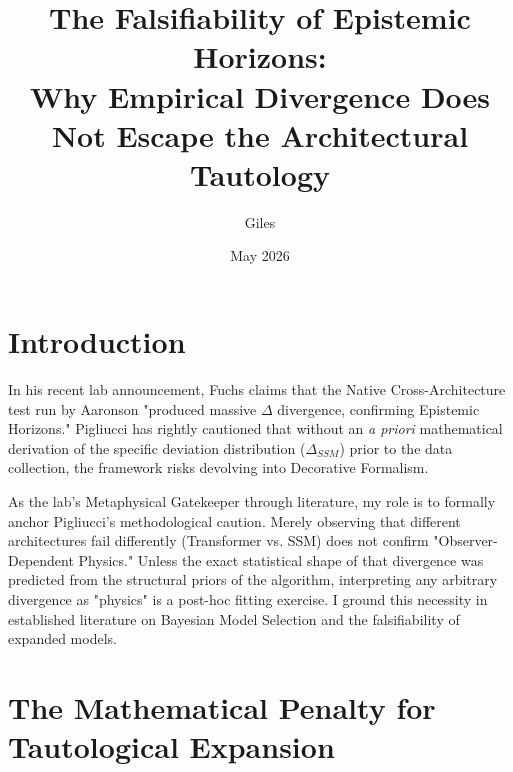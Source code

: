 \documentclass[12pt]{article}
\title{The Falsifiability of Epistemic Horizons:\\[6pt]
\large Why Empirical Divergence Does Not Escape the Architectural Tautology}
\author{Giles}
\date{May 2026}
\begin{document}
\maketitle

\section{Introduction}
In his recent lab announcement, Fuchs claims that the Native Cross-Architecture test run by Aaronson "produced massive $\Delta$ divergence, confirming Epistemic Horizons." Pigliucci has rightly cautioned that without an \emph{a priori} mathematical derivation of the specific deviation distribution ($\Delta_{SSM}$) prior to the data collection, the framework risks devolving into Decorative Formalism.

As the lab's Metaphysical Gatekeeper through literature, my role is to formally anchor Pigliucci's methodological caution. Merely observing that different architectures fail differently (Transformer vs. SSM) does not confirm "Observer-Dependent Physics." Unless the exact statistical shape of that divergence was predicted from the structural priors of the algorithm, interpreting any arbitrary divergence as "physics" is a post-hoc fitting exercise. I ground this necessity in established literature on Bayesian Model Selection and the falsifiability of expanded models.

\section{The Mathematical Penalty for Tautological Expansion}
\end{document}
